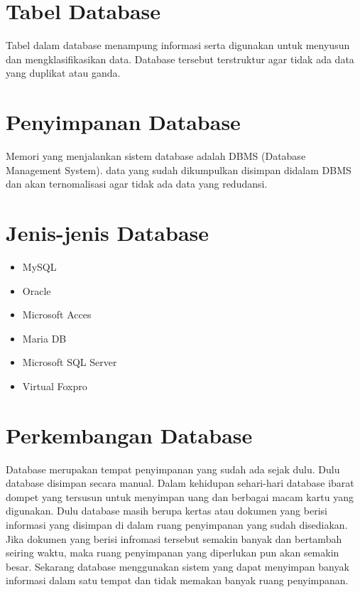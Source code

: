 \documentclass{article}
\begin{document}
\section{Tabel Database}
Tabel dalam database menampung informasi serta digunakan untuk menyusun dan mengklasifikasikan data. Database tersebut terstruktur agar tidak ada data yang duplikat atau ganda. 

\section{Penyimpanan Database}
Memori yang menjalankan sistem database adalah DBMS (Database Management System). data yang sudah dikumpulkan disimpan didalam DBMS dan akan ternomalisasi agar tidak ada data yang redudansi.

\section{Jenis-jenis Database}
\begin{itemize}
    \item MySQL
    \item Oracle
    \item Microsoft Acces
    \item Maria DB
    \item Microsoft SQL Server
    \item Virtual Foxpro
\end{itemize}

\section{Perkembangan Database}
Database merupakan tempat penyimpanan yang sudah ada sejak dulu. Dulu database disimpan secara manual. Dalam kehidupan sehari-hari database ibarat dompet yang tersusun untuk menyimpan uang dan berbagai macam kartu yang digunakan. Dulu database masih berupa kertas atau dokumen yang berisi informasi yang disimpan di dalam ruang penyimpanan yang sudah disediakan. Jika dokumen yang berisi infromasi tersebut semakin banyak dan bertambah seiring waktu, maka ruang penyimpanan yang diperlukan pun akan semakin besar. Sekarang database menggunakan sistem yang dapat menyimpan banyak informasi dalam satu tempat dan tidak memakan banyak ruang penyimpanan. 



\end{document}
